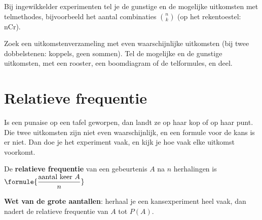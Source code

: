 \begin{oefeningen}
\end{oefeningen}

Bij ingewikkelder experimenten tel je de gunstige en de mogelijke uitkomsten met telmethodes, bijvoorbeeld het aantal combinaties $\binom{n}{k}$ (op het rekentoestel: nCr).


\begin{werkwijze}
Zoek een uitkomstenverzameling met even waarschijnlijke uitkomsten (bij twee dobbelstenen: koppels, geen sommen). Tel de mogelijke en de gunstige uitkomsten, met een rooster, een boomdiagram of de telformules, en deel.
\end{werkwijze}


\begin{oefeningen}

\end{oefeningen}

\section{Relatieve frequentie}

Is een punaise op een tafel geworpen, dan landt ze op haar kop of op haar punt. Die twee uitkomsten zijn niet even waarschijnlijk, en een formule voor de kans is er niet. Dan doe je het experiment vaak, en kijk je hoe vaak elke uitkomst voorkomt.

\begin{theorie}
De \textbf{\textcolor{accent}{relatieve frequentie}} van een gebeurtenis $A$ na $n$ herhalingen is \quad $\formule{\dfrac{\text{aantal keer } A}{n}}$

\vspace{1mm}
\textbf{\textcolor{accent}{Wet van de grote aantallen}}: herhaal je een kansexperiment heel vaak, dan nadert de relatieve frequentie van $A$ tot $P(A)$.
\end{theorie}

